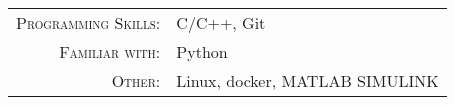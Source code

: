 
\renewcommand{\arraystretch}{1.1}

\begin{tabular}{>{}r>{}p{13cm}}
	\textsc{Programming Skills:} & C/C++, Git                     \\
	\textsc{Familiar with:}       &Python								  \\
	\textsc{Other:}              & Linux, docker, MATLAB SIMULINK
\end{tabular}

